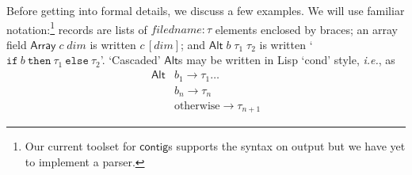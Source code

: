 \documentclass[a4paper,UKenglish,cleveref, autoref, thm-restate]{lipics-v2021}
\newcommand{\ie}{\textit{i.e.}}
\newcommand{\konst}[1]{\ensuremath{\mathsf{#1}}}
\newcommand{\itelse}[3]{\mbox{$\mathtt{if}\ {#1}\ \mathtt{then}\ {#2}\ \mathtt{else}\ {#3}$}}
\begin{document}
Before getting into formal details, we discuss a few examples.  We
will use familiar notation:\footnote{Our current toolset for
  \konst{contig}s supports the syntax on output but we have yet to
  implement a parser.} records are lists of $\mathit{filedname} : \tau$
elements enclosed by braces; an array field
$\konst{Array}\;c\;\mathit{dim}$ is written $c\, [\mathit{dim}]$; and
$\konst{Alt}\;b\;\tau_1\;\tau_2$ is written
`$\itelse{b}{\tau_1}{\tau_2}$'. `Cascaded' \konst{Alt}s may be written
in Lisp `cond' style, \ie, as
\[
\begin{array}{ll}
\konst{Alt} & b_1 \longrightarrow \tau_1 \ldots \\
            & b_n \longrightarrow \tau_n \\
            & \text{otherwise} \longrightarrow \tau_{n+1}
\end{array}
\]
\end{document}
